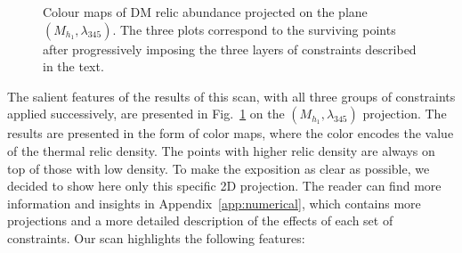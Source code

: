 \documentclass[12pt,a4paper]{article}
\begin{document}
\begin{figure}[tbh]
\begin{center}
\caption{Colour maps of DM relic abundance projected on the plane $(M_{h_1},\lambda_{345})$. The three plots correspond to the surviving points after progressively imposing the three layers of constraints described in the text. \label{fig:scan-simplified}} 
\end{center}
\end{figure}

The salient features of the results of this scan,
with all three groups of constraints applied successively, 
are presented in Fig.~\ref{fig:scan-simplified} on the $(M_{h_1},\lambda_{345})$ projection.
The results are presented in the form of color maps, where the color encodes the value of the thermal relic density. The points with higher relic density are always  on top of those with low density.
To make the exposition as clear as possible, we decided to show here only this specific 2D projection. 
The reader can find more information and insights in Appendix~\ref{app:numerical}, which contains more projections and a more detailed description of the effects of each set of constraints.
Our scan highlights the following features:
\end{document}
